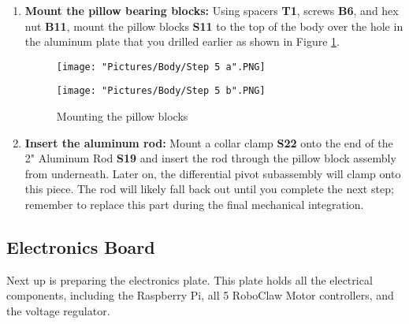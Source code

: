 \documentclass[12pt]{article}
\begin{document}
\begin{enumerate}
\item \textbf{Mount the pillow bearing blocks:} Using spacers \textbf{T1}, screws \textbf{B6}, and hex nut \textbf{B11}, mount the pillow blocks \textbf{S11} to the top of the body over the hole in the aluminum plate that you drilled earlier as shown in Figure \ref{mount pillow blocks}.

\begin{figure}[H]
  \centering
  \begin{minipage}[b]{0.30\textwidth}
    \texttt{[image: "Pictures/Body/Step 5 a".PNG]}
  \end{minipage}
  \hfill
  \begin{minipage}[b]{0.55\textwidth}
    \texttt{[image: "Pictures/Body/Step 5 b".PNG]}
  \end{minipage}
  \caption{Mounting the pillow blocks}
  \label{mount pillow blocks}
\end{figure}

\item \textbf{Insert the aluminum rod:} Mount a collar clamp \textbf{S22} onto the end of the 2" Aluminum Rod \textbf{S19} and insert the rod through the pillow block assembly from underneath.  Later on, the differential pivot subassembly will clamp onto this piece.  The rod will likely fall back out until you complete the next step; remember to replace this part during the final mechanical integration.

\end{enumerate}

\subsection{Electronics Board}

Next up is preparing the electronics plate. This plate holds all the electrical components, including the Raspberry Pi, all 5 RoboClaw Motor controllers, and the voltage regulator.
\end{document}
